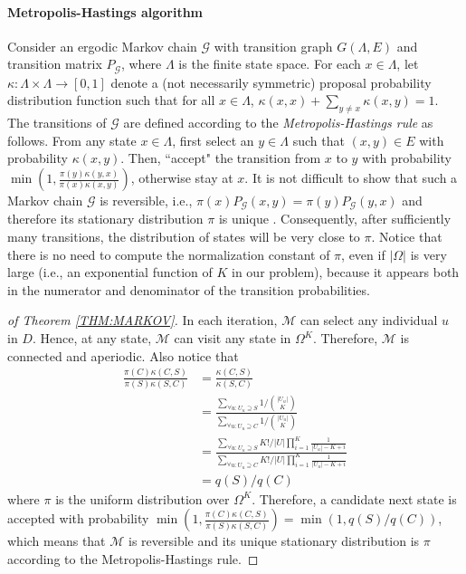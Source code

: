 \documentclass{acm_proc_article-sp}
\theoremstyle{plain}
\theoremstyle{plain}
\theoremstyle{plain}
\theoremstyle{plain}
\theoremstyle{plain}
\theoremstyle{plain}
\newcommand{\mc}[1]{\mathcal{#1}}
\begin{document}
\paragraph{Metropolis-Hastings algorithm} Consider an ergodic  Markov  chain $\mc{G}$ with transition graph $G(\Lambda, E)$ and transition matrix $P_{\mc{G}}$, where $\Lambda$ is the finite state space.
 For each $x\in \Lambda$, 
let $\kappa: \Lambda \times \Lambda \rightarrow [0,1]$ denote a (not necessarily symmetric) proposal probability distribution function such that for all $x\in \Lambda$, $\kappa(x,x)  + \sum_{y\neq x} \kappa(x,y) = 1$.
The transitions of $\mc{G}$ are defined according to the \emph{Metropolis-Hastings rule} as follows. From any state $x \in \Lambda$, first select an $y\in \Lambda$ such that $(x,y) \in E$ with probability $\kappa(x,y)$. Then,
``accept" the transition from $x$ to $y$ with probability $\min\left(1, \frac{\pi(y)\kappa(y,x)}{\pi(x)\kappa(x,y)}\right)$, otherwise stay at $x$. 
It is not difficult to show \cite{LevinPW09mixing} that such a Markov chain $\mc{G}$ is reversible, i.e., $\pi(x)P_{\mc{G}}(x,y) = \pi(y)P_{\mc{G}}(y,x)$ and therefore its stationary distribution $\pi$ is unique \cite{LevinPW09mixing}. Consequently,  after sufficiently many transitions, the distribution of states will be very close to $\pi$. Notice that there is no need to compute the normalization constant of $\pi$,  even if $|\Omega|$ is very large (i.e., an exponential function of $K$ in our problem), because it appears both in the numerator and denominator of the transition probabilities. 




\begin{proof}[of Theorem \ref{THM:MARKOV}]
In each iteration, $\mathcal{M}$ can select any individual $u$ in $D$.  Hence, at any state, $\mathcal{M}$ can visit any state in $\Omega^K$. Therefore, $\mathcal{M}$ is connected and aperiodic. Also notice that 
\begin{align*}
\frac{\pi(C) \kappa(C,S)}{\pi(S) \kappa(S,C)} &= \frac{\kappa(C,S)}{\kappa(S,C)} \\
&= \frac{\sum_{\forall u : U_u \supseteq S}  1 / {|U_u| \choose K}}{ \sum_{\forall u : U_u \supseteq C}  1 / {|U_u| \choose K}}  \\
&=\frac{\sum_{\forall u : U_u \supseteq S} K!/|U|  \prod_{i = 1}^{K} \frac{1}{|U_u| - K + i}}{ \sum_{\forall u : U_u \supseteq C} K!/|U|  \prod_{i = 1}^{K} \frac{1}{|U_u| - K + i}} \\
&=  q(S)/q(C)
\end{align*}
where $\pi$ is the uniform distribution over $\Omega^K$. Therefore, a candidate next state is accepted with probability $\min\left(1, \frac{\pi(C)\kappa(C,S)}{\pi(S)\kappa(S,C)}\right) = \min\left(1, q(S)/q(C)\right)$, which means that
$\mathcal{M}$ is reversible and its unique stationary distribution is $\pi$ according to the Metropolis-Hastings rule.
\end{proof}
\end{document}
